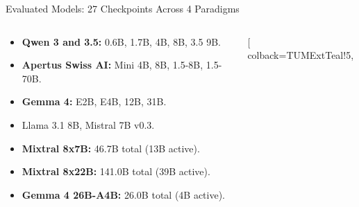 \documentclass[
  english,
  aspectratio=169,
]{tumbeamer}
\begin{document}
\begin{frame}{Evaluated Models: 27 Checkpoints Across 4 Paradigms}
  \begin{columns}[T]
    \begin{column}{0.485\textwidth}
      \begin{tcolorbox}[
        colback=TUMBlue!5,
        colframe=TUMBlue,
        coltitle=white,
        fonttitle=\bfseries\scriptsize,
        title=Dense Causal Decoders (15 models),
        arc=1.2mm, boxrule=0.7pt,
        height=2.38cm,
        left=3pt, right=3pt, top=1.5pt, bottom=1.5pt
      ]
        \vspace{-0.25em}
        \setlength{\leftmargini}{9pt}
        \begin{itemize}\scriptsize \setlength{\itemsep}{0.2pt}
          \item \textbf{Qwen 3 and 3.5:} 0.6B, 1.7B, 4B, 8B, 3.5 9B.
          \item \textbf{Apertus Swiss AI:} Mini 4B, 8B, 1.5-8B, 1.5-70B.
          \item \textbf{Gemma 4:} E2B, E4B, 12B, 31B.
          \item Llama 3.1 8B, Mistral 7B v0.3.
        \end{itemize}
      \end{tcolorbox}
      \vspace{0.12em}
      \begin{tcolorbox}[
        colback=TUMExtViolet!5,
        colframe=TUMExtViolet,
        coltitle=white,
        fonttitle=\bfseries\scriptsize,
        title=Sparse Mixture-of-Experts (3 models),
        arc=1.2mm, boxrule=0.7pt,
        height=2.38cm,
        left=3pt, right=3pt, top=1.5pt, bottom=1.5pt
      ]
        \vspace{-0.25em}
        \setlength{\leftmargini}{9pt}
        \begin{itemize}\scriptsize \setlength{\itemsep}{0.2pt}
          \item \textbf{Mixtral 8x7B:} 46.7B total (13B active).
          \item \textbf{Mixtral 8x22B:} 141.0B total (39B active).
          \item \textbf{Gemma 4 26B-A4B:} 26.0B total (4B active).
        \end{itemize}
      \end{tcolorbox}
    \end{column}
    \begin{column}{0.485\textwidth}
      \begin{tcolorbox}[
        colback=TUMExtTeal!5,

\end{tcolorbox}
\end{column}
\end{columns}
\end{frame}
\end{document}
